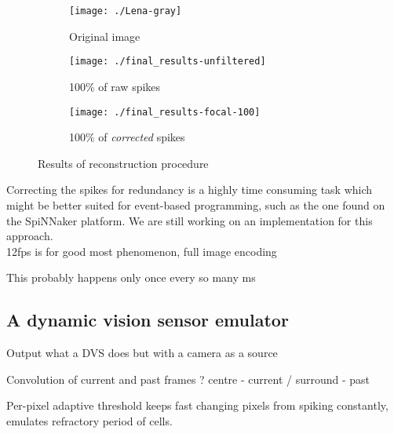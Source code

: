 \begin{figure}
  \centering
  \begin{subfigure}[t]{0.32\textwidth}
    \centering
    \captionsetup{justification=centering,margin=0.1cm}
    \texttt{[image: ./Lena-gray]}
    \caption{Original image}
    \label{pic-original-lena}
  \end{subfigure}
  \begin{subfigure}[t]{0.32\textwidth}
    \centering
    \captionsetup{justification=centering,margin=0.1cm}
    \texttt{[image: ./final\_results-unfiltered]}
    \caption{100\% of raw spikes}
    \label{pic-unfiltered-spikes}
  \end{subfigure}
  \begin{subfigure}[t]{0.32\textwidth}
    \centering
    \captionsetup{justification=centering,margin=0.1cm}
    \texttt{[image: ./final\_results-focal-100]}
    \caption{100\% of \emph{corrected} spikes}
    \label{pic-100pc-spikes}
  \end{subfigure}
  \caption{Results of reconstruction procedure}
  \label{fig-reconstruction}
  \vspace*{-10pt}
\end{figure}
Correcting the spikes for redundancy is a highly time consuming task which
might be better suited for event-based programming, such as the one found on 
the SpiNNaker platform. We are still working on an implementation for this 
approach.\\




12fps is for good most phenomenon, full image encoding

This probably happens only once every so many ms


\subsection{A dynamic vision sensor emulator}

Output what a DVS does but with a camera as a source

Convolution of current and past frames ? centre - current / surround - past

Per-pixel adaptive threshold keeps fast changing pixels from spiking constantly, emulates refractory period of cells.



